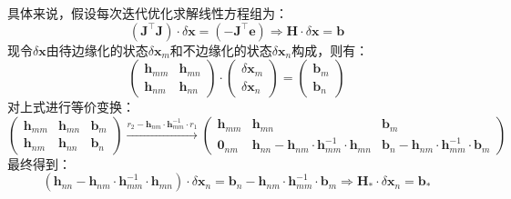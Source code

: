 \documentclass[12pt, onecolumn]{article}
\begin{document}
	具体来说，假设每次迭代优化求解线性方程组为：
		\begin{equation}
		\left( \boldsymbol{J}^\top\boldsymbol{J}\right) \cdot\delta\boldsymbol{x}=
		\left( -\boldsymbol{J}^\top\boldsymbol{e}\right) 
		\Rightarrow
		\boldsymbol{H}\cdot\delta\boldsymbol{x}=\boldsymbol{b}
		\end{equation}
		现令$\delta\boldsymbol{x}$由待边缘化的状态$\delta\boldsymbol{x}_m$和不边缘化的状态$\delta\boldsymbol{x}_n$构成，则有：
		\begin{equation}
		\begin{pmatrix}
		\boldsymbol{h}_{mm}&\boldsymbol{h}_{mn}\\
		\boldsymbol{h}_{nm}&\boldsymbol{h}_{nn}
		\end{pmatrix}\cdot\begin{pmatrix}
		\delta\boldsymbol{x}_m\\
		\delta\boldsymbol{x}_n
		\end{pmatrix}=\begin{pmatrix}
		\boldsymbol{b}_{m}\\\boldsymbol{b}_{n}
		\end{pmatrix}
		\end{equation}
		对上式进行等价变换：
		\begin{equation}
		\left( \begin{array}{cc|c}
		\boldsymbol{h}_{mm}&\boldsymbol{h}_{mn}&\boldsymbol{b}_m\\
		\boldsymbol{h}_{nm}&\boldsymbol{h}_{nn}&\boldsymbol{b}_n
		\end{array}\right) 
		\xrightarrow{r_2-\boldsymbol{h}_{nm}\cdot\boldsymbol{h}_{mm}^{-1}\cdot r_1}
		\left( \begin{array}{cc|cc}
		\boldsymbol{h}_{mm}&\boldsymbol{h}_{mn}&\boldsymbol{b}_m\\
		\boldsymbol{0}_{nm}&\boldsymbol{h}_{nn}-\boldsymbol{h}_{nm}\cdot\boldsymbol{h}_{mm}^{-1}\cdot\boldsymbol{h}_{mn}
		&
		\boldsymbol{b}_n-\boldsymbol{h}_{nm}\cdot\boldsymbol{h}_{mm}^{-1}\cdot\boldsymbol{b}_{m}
		\end{array}\right) 
		\end{equation}
		最终得到：
		\begin{equation}
		\left(
		\boldsymbol{h}_{nn}-\boldsymbol{h}_{nm}\cdot\boldsymbol{h}_{mm}^{-1}\cdot\boldsymbol{h}_{mn}\right) \cdot\delta\boldsymbol{x}_n=	\boldsymbol{b}_n-\boldsymbol{h}_{nm}\cdot\boldsymbol{h}_{mm}^{-1}\cdot\boldsymbol{b}_{m}
		\Rightarrow
		\boldsymbol{H}_*\cdot\delta\boldsymbol{x}_n=\boldsymbol{b}_*
		\end{equation}
\end{document}
